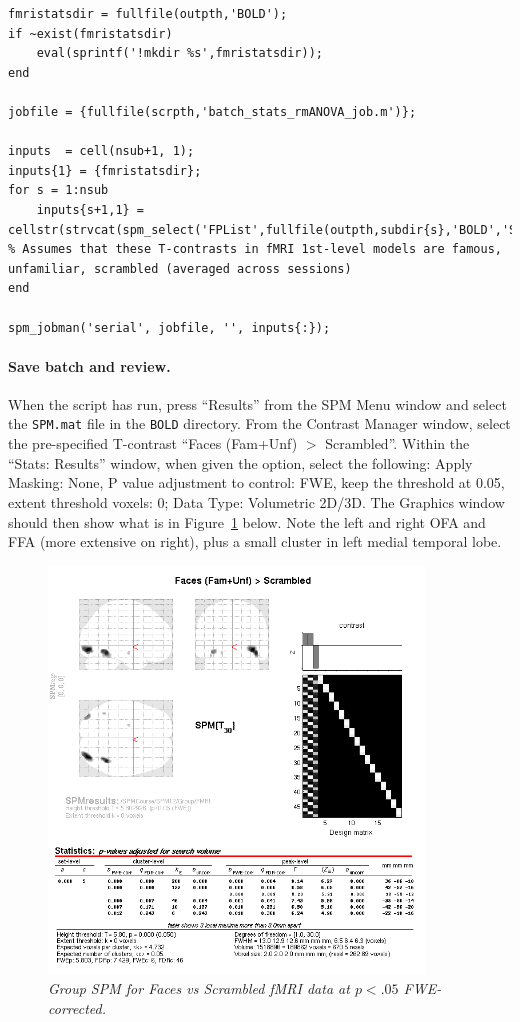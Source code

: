 \begin{lstlisting}[style=Matlab-editor,basicstyle=\mlttfamily\footnotesize]
fmristatsdir = fullfile(outpth,'BOLD');
if ~exist(fmristatsdir)
    eval(sprintf('!mkdir %s',fmristatsdir));
end

jobfile = {fullfile(scrpth,'batch_stats_rmANOVA_job.m')};

inputs  = cell(nsub+1, 1);
inputs{1} = {fmristatsdir};
for s = 1:nsub
    inputs{s+1,1} = cellstr(strvcat(spm_select('FPList',fullfile(outpth,subdir{s},'BOLD','Stats'),'con_000[345].nii')));   % Assumes that these T-contrasts in fMRI 1st-level models are famous, unfamiliar, scrambled (averaged across sessions)
end

spm_jobman('serial', jobfile, '', inputs{:});
\end{lstlisting}

\paragraph{Save batch and review.}

When the script has run, press ``Results'' from the SPM Menu window and select the \texttt{SPM.mat} file in the \texttt{BOLD} directory. From the Contrast Manager window, select the pre-specified T-contrast ``Faces (Fam+Unf) \(>\) Scrambled''.  Within the ``Stats: Results'' window, when given the option, select the following:  Apply Masking: None, P value adjustment to control: FWE, keep the threshold at 0.05, extent threshold {voxels}: 0; Data Type: Volumetric 2D/3D. The Graphics window should then show what is in Figure~\ref{multi:fig:11} below. Note the left and right OFA and FFA (more extensive on right), plus a small cluster in left medial temporal lobe.

\begin{figure}
\begin{center}
\includegraphics[width=100mm]{multi/figures/figure11}
\caption{\em Group SPM for Faces vs Scrambled fMRI data at \(p<.05\) FWE-corrected. \label{multi:fig:11}}
\end{center}
\end{figure}


